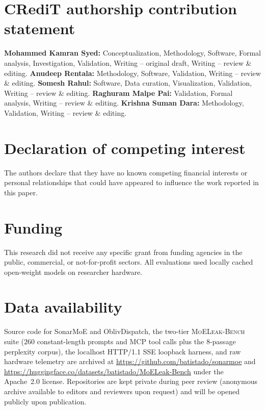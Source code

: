 \documentclass[final,5p,times,twocolumn]{elsarticle}
\def\SM{SonarMoE}%
\def\OD{OblivDispatch}%
\theoremstyle{definition}
\theoremstyle{remark}
\newcommand{\SM}{\textsc{SonarMoE}}
\newcommand{\OD}{\textsc{OblivDispatch}}
\newcommand{\MLB}{\textsc{MoELeak-Bench}}
\begin{document}
\section*{CRediT authorship contribution statement}
\textbf{Mohammed Kamran Syed:} Conceptualization, Methodology, Software, Formal analysis, Investigation, Validation, Writing -- original draft, Writing -- review \& editing.
\textbf{Anudeep Rentala:} Methodology, Software, Validation, Writing -- review \& editing.
\textbf{Somesh Rahul:} Software, Data curation, Visualization, Validation, Writing -- review \& editing.
\textbf{Raghuram Malpe Pai:} Validation, Formal analysis, Writing -- review \& editing.
\textbf{Krishna Suman Dara:} Methodology, Validation, Writing -- review \& editing.

\section*{Declaration of competing interest}
The authors declare that they have no known competing financial interests or personal relationships that could have appeared to influence the work reported in this paper.

\section*{Funding}
This research did not receive any specific grant from funding agencies in the public, commercial, or not-for-profit sectors. All evaluations used locally cached open-weight models on researcher hardware.

\section*{Data availability}
Source code for \SM{} and \OD{}, the two-tier \MLB{} suite ($260$ constant-length prompts and MCP tool calls plus the $8$-passage perplexity corpus), the localhost HTTP/1.1 SSE loopback harness, and raw hardware telemetry are archived at \url{https://github.com/batistado/sonarmoe} and \url{https://huggingface.co/datasets/batistado/MoELeak-Bench} under the Apache~2.0 license. Repositories are kept private during peer review (anonymous archive available to editors and reviewers upon request) and will be opened publicly upon publication.



\end{document}
